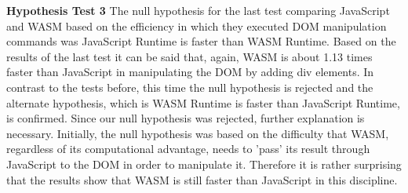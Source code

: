 \textbf{Hypothesis Test 3} \newline
The null hypothesis for the last test comparing JavaScript and WASM based on the efficiency in which they executed DOM manipulation commands was \dq JavaScript Runtime is faster than WASM Runtime\dq . Based on the results of the last test it can be said that, again, WASM is about 1.13 times faster than JavaScript in manipulating the DOM by adding div elements. In contrast to the tests before, this time the null hypothesis is rejected and the alternate hypothesis, which is \dq WASM Runtime is faster than JavaScript Runtime\dq , is confirmed. Since our null hypothesis was rejected, further explanation is necessary. Initially, the null hypothesis was based on the difficulty that WASM, regardless of its computational advantage, needs to 'pass' its result through JavaScript to the DOM in order to manipulate it. Therefore it is rather surprising that the results show that WASM is still faster than JavaScript in this discipline.